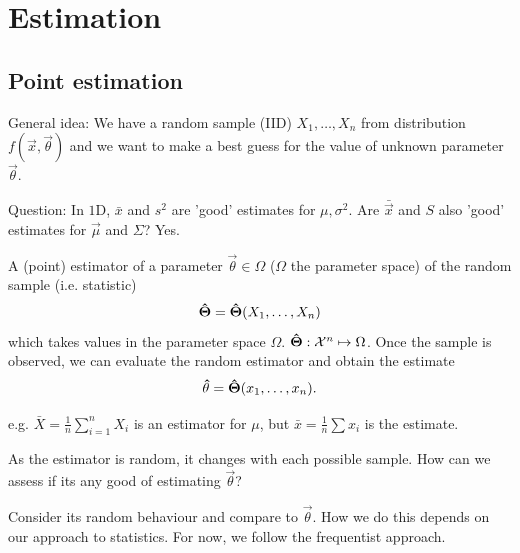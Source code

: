 \documentclass[10pt, a4paper]{article}
\begin{document}
\newpage

\section{Estimation}

\subsection{Point estimation}

General idea:
We have a random sample
(IID)
$X_1, \dotsc, X_n$ from distribution $f(\vec{x}, \vec{\theta})$ and we want to make a best guess for the value of unknown parameter $\vec{\theta}$.

Question:
In $1$D,
$\bar{x}$ and $s ^ 2$ are
'good'
estimates for $\mu, \sigma ^ 2$.
Are $\bar{\vec{x}}$ and $S$ also
'good'
estimates for $\vec{\mu}$ and $\Sigma$?
Yes.

\begin{definition}
    A
    (point)
    estimator of a parameter $\vec{\theta} \in \Omega$
    ($\Omega$ the parameter space)
    of the random sample
    (i.e. statistic)
    \[
    \mathbf{\hat{\Theta}} = \mathbf{\hat{\Theta}}(X_1, \dotsc, X_n)
    \]
    which takes values in the parameter space $\Omega$.
    $\mathbf{\hat{\Theta}} : \mathcal{X} ^ n \mapsto \Omega$.
    Once the sample is observed,
    we can evaluate the random estimator and obtain the estimate
    \[
    \mathbf{\hat{\theta}} = \mathbf{\hat{\Theta}}(x_1, \dotsc, x_n).
    \]
\end{definition}

e.g.
$\bar{X} = \frac{1}{n}\sum_{i = 1}^{n}X_i$ is an estimator for $\mu$,
but $\bar{x} = \frac{1}{n}\sum x_i$ is the estimate.

As the estimator is random,
it changes with each possible sample.
How can we assess if its any good of estimating $\vec{\theta}$?

Consider its random behaviour and compare to $\vec{\theta}$.
How we do this depends on our approach to statistics.
For now,
we follow the frequentist approach.
\end{document}
